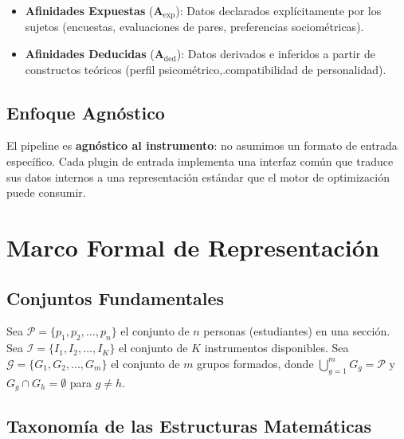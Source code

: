 \documentclass[12pt,a4paper]{article}
\begin{document}
\begin{definitionbox}
\begin{itemize}
    \item \textbf{Afinidades Expuestas} ($\mathbf{A}_{\text{exp}}$): Datos declarados explícitamente por los sujetos (encuestas, evaluaciones de pares, preferencias sociométricas).
    \item \textbf{Afinidades Deducidas} ($\mathbf{A}_{\text{ded}}$): Datos derivados e inferidos a partir de constructos teóricos (perfil psicométrico,.compatibilidad de personalidad).
\end{itemize}
\end{definitionbox}

\subsection{Enfoque Agnóstico}

El pipeline es \textbf{agnóstico al instrumento}: no asumimos un formato de entrada específico. Cada plugin de entrada implementa una interfaz común que traduce sus datos internos a una representación estándar que el motor de optimización puede consumir.

\section{Marco Formal de Representación}

\subsection{Conjuntos Fundamentales}

\begin{definitionbox}
Sea $\mathcal{P} = \{p_1, p_2, \ldots, p_n\}$ el conjunto de $n$ personas (estudiantes) en una sección.
Sea $\mathcal{I} = \{I_1, I_2, \ldots, I_K\}$ el conjunto de $K$ instrumentos disponibles.
Sea $\mathcal{G} = \{G_1, G_2, \ldots, G_m\}$ el conjunto de $m$ grupos formados, donde $\bigcup_{g=1}^{m} G_g = \mathcal{P}$ y $G_g \cap G_h = \emptyset$ para $g \neq h$.
\end{definitionbox}

\subsection{Taxonomía de las Estructuras Matemáticas}
\end{document}

